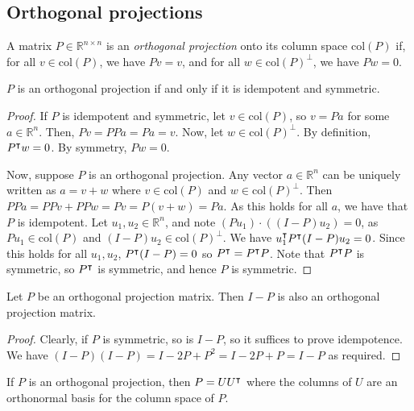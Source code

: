 \subsection{Orthogonal projections}
\begin{definition}
	A matrix \( P \in \mathbb R^{n \times n} \) is an \textit{orthogonal projection} onto its column space \( \mathrm{col}(P) \) if, for all \( v \in \mathrm{col}(P) \), we have \( Pv = v \), and for all \( w \in \mathrm{col}(P)^\perp \), we have \( Pw = 0 \).
\end{definition}
\begin{proposition}
	\( P \) is an orthogonal projection if and only if it is idempotent and symmetric.
\end{proposition}
\begin{proof}
	If \( P \) is idempotent and symmetric, let \( v \in \mathrm{col}(P) \), so \( v = Pa \) for some \( a \in \mathbb R^n \).
	Then, \( Pv = PPa = Pa = v \).
	Now, let \( w \in \mathrm{col}(P)^\perp \).
	By definition, \( P^\intercal w = 0 \).
	By symmetry, \( Pw = 0 \).

	Now, suppose \( P \) is an orthogonal projection.
	Any vector \( a \in \mathbb R^n \) can be uniquely written as \( a = v + w \) where \( v \in \mathrm{col}(P) \) and \( w \in \mathrm{col}(P)^\perp \).
	Then \( PPa = PPv + PPw = Pv = P(v+w) = Pa \).
	As this holds for all \( a \), we have that \( P \) is idempotent.
	Let \( u_1, u_2 \in \mathbb R^n \), and note \( (P u_1) \cdot ((I-P) u_2) = 0 \), as \( P u_1 \in \mathrm{col}(P) \) and \( (I-P) u_2 \in \mathrm{col}(P)^\perp \).
	We have \( u_1^\intercal P^\intercal (I-P) u_2 = 0 \).
	Since this holds for all \( u_1, u_2 \), \( P^\intercal (I-P) = 0 \) so \( P^\intercal = P^\intercal P \).
	Note that \( P^\intercal P \) is symmetric, so \( P^\intercal \) is symmetric, and hence \( P \) is symmetric.
\end{proof}
\begin{corollary}
	Let \( P \) be an orthogonal projection matrix.
	Then \( I-P \) is also an orthogonal projection matrix.
\end{corollary}
\begin{proof}
	Clearly, if \( P \) is symmetric, so is \( I-P \), so it suffices to prove idempotence.
	We have \( (I-P)(I-P) = I - 2P + P^2 = I - 2P + P = I - P \) as required.
\end{proof}
\begin{proposition}
	If \( P \) is an orthogonal projection, then \( P = UU^\intercal \) where the columns of \( U \) are an orthonormal basis for the column space of \( P \).
\end{proposition}
